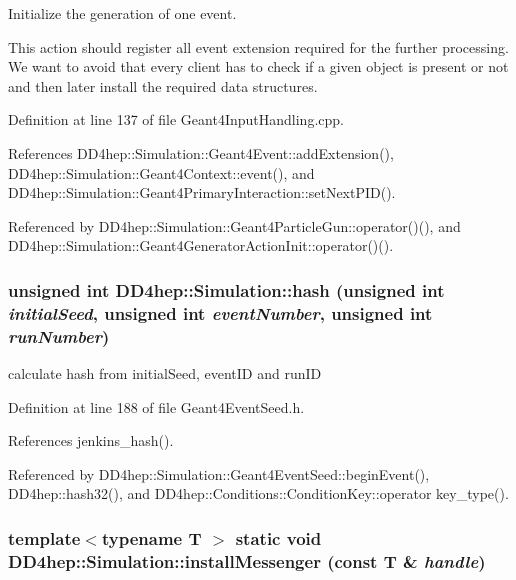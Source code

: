 Initialize the generation of one event. 

This action should register all event extension required for the further processing. We want to avoid that every client has to check if a given object is present or not and then later install the required data structures.

Definition at line 137 of file Geant4InputHandling.cpp.

References DD4hep::Simulation::Geant4Event::addExtension(), DD4hep::Simulation::Geant4Context::event(), and DD4hep::Simulation::Geant4PrimaryInteraction::setNextPID().

Referenced by DD4hep::Simulation::Geant4ParticleGun::operator()(), and DD4hep::Simulation::Geant4GeneratorActionInit::operator()().\hypertarget{namespace_d_d4hep_1_1_simulation_ae0f666f5766acb8613abdf7257606965}{
\subsubsection[{hash}]{\setlength{\rightskip}{0pt plus 5cm}unsigned int DD4hep::Simulation::hash (unsigned int {\em initialSeed}, \/  unsigned int {\em eventNumber}, \/  unsigned int {\em runNumber})}}
\label{namespace_d_d4hep_1_1_simulation_ae0f666f5766acb8613abdf7257606965}


calculate hash from initialSeed, eventID and runID 

Definition at line 188 of file Geant4EventSeed.h.

References jenkins\_\-hash().

Referenced by DD4hep::Simulation::Geant4EventSeed::beginEvent(), DD4hep::hash32(), and DD4hep::Conditions::ConditionKey::operator key\_\-type().\hypertarget{namespace_d_d4hep_1_1_simulation_a5ab8883ec8f501df46dbeb15623d1366}{
\subsubsection[{installMessenger}]{\setlength{\rightskip}{0pt plus 5cm}template$<$typename T $>$ static void DD4hep::Simulation::installMessenger (const {\bf T} \& {\em handle})}}
\label{namespace_d_d4hep_1_1_simulation_a5ab8883ec8f501df46dbeb15623d1366}


